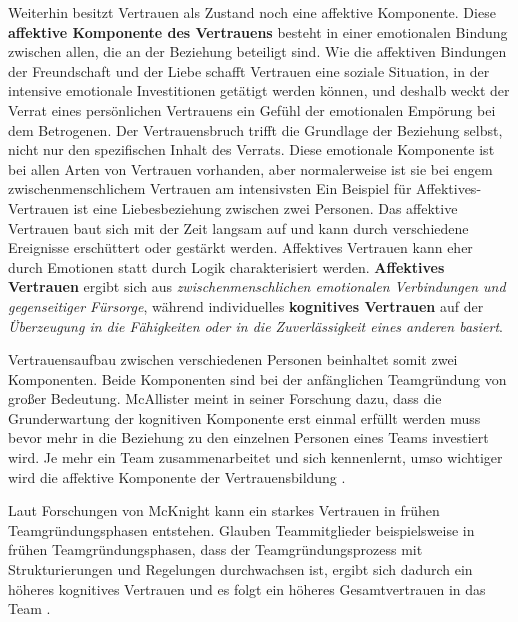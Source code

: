 \documentclass[a4paper,11pt]{article}%
\renewcommand{\\}{\vspace*{0.5\baselineskip} \newline}
\begin{document}
Weiterhin besitzt Vertrauen als \dq{}Zustand\dq{} noch eine affektive Komponente.\\ \dq Diese \textbf{affektive Komponente des Vertrauens} besteht in einer emotionalen Bindung zwischen allen, die an der Beziehung beteiligt sind. Wie die affektiven Bindungen der Freundschaft und der Liebe schafft Vertrauen eine soziale Situation, in der intensive emotionale Investitionen getätigt werden können, und deshalb weckt der Verrat eines persönlichen Vertrauens ein Gefühl der emotionalen Empörung bei dem Betrogenen. Der Vertrauensbruch trifft die Grundlage der Beziehung selbst, nicht nur den spezifischen Inhalt des Verrats. Diese emotionale Komponente ist bei allen Arten von Vertrauen vorhanden, aber normalerweise ist sie bei engem zwischenmenschlichem Vertrauen am intensivsten \dq{} \citep[p.971]{lewis1985trust}
\\
Ein Beispiel für Affektives-Vertrauen ist eine Liebesbeziehung zwischen zwei Personen. Das affektive Vertrauen baut sich mit der Zeit langsam auf und kann durch verschiedene Ereignisse erschüttert oder gestärkt werden. Affektives Vertrauen kann eher durch Emotionen statt durch Logik charakterisiert werden.
\textbf{Affektives Vertrauen} ergibt sich aus \textit{zwischenmenschlichen emotionalen Verbindungen und gegenseitiger Fürsorge}, während individuelles \textbf{kognitives Vertrauen} auf der \textit{Überzeugung in die Fähigkeiten oder in die Zuverlässigkeit eines anderen basiert}. 

Vertrauensaufbau zwischen verschiedenen Personen beinhaltet somit zwei Komponenten. Beide Komponenten sind bei der anfänglichen Teamgründung von großer Bedeutung. 
McAllister meint in seiner Forschung dazu, dass die Grunderwartung der kognitiven Komponente erst einmal erfüllt werden muss bevor mehr in die Beziehung zu den einzelnen Personen eines Teams investiert wird. Je mehr ein Team zusammenarbeitet und sich kennenlernt, umso wichtiger wird die affektive Komponente der Vertrauensbildung \citep[p.30]{mcallister1995affect}.

Laut Forschungen von McKnight kann ein starkes Vertrauen in frühen Teamgründungsphasen entstehen. Glauben Teammitglieder beispielsweise in frühen Teamgründungsphasen, dass der Teamgründungsprozess mit Strukturierungen und Regelungen durchwachsen ist, ergibt sich dadurch ein höheres kognitives Vertrauen und es folgt ein höheres Gesamtvertrauen in das Team \citep[p.478-479]{mcknight1998initial}.
\end{document}
